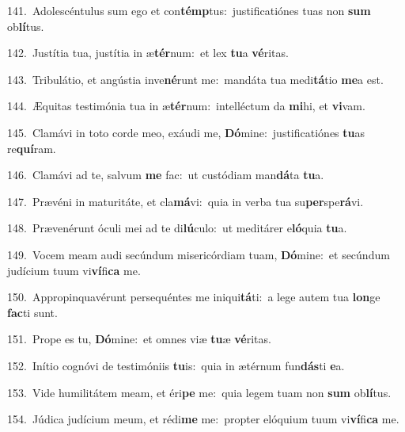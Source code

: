 {\numbfont\textcolor{\numbcolor}{141.}}~Adolescéntulus sum ego et con\-\textbf{témp}\-tus:~\star justificatiónes tuas non \textbf{sum} ob\-\textbf{lí}\-tus.\par
{\numbfont\textcolor{\numbcolor}{142.}}~Justítia tua, justítia in æ\-\textbf{tér}\-num:~\star et lex \textbf{tu}\-a \textbf{vé}\-ritas.\par
{\numbfont\textcolor{\numbcolor}{143.}}~Tribulátio, et angústia inve\-\textbf{né}\-runt me:~\star mandáta tua medi\-\textbf{tá}\-tio \textbf{me}\-a est.\par
{\numbfont\textcolor{\numbcolor}{144.}}~Æquitas testimónia tua in æ\-\textbf{tér}\-num:~\star intelléctum da \textbf{mi}\-hi, et \textbf{vi}\-vam.\par
{\numbfont\textcolor{\numbcolor}{145.}}~Clamávi in toto corde meo, exáudi me, \textbf{Dó}\-mine:~\star justificatiónes \textbf{tu}\-as re\-\textbf{quí}\-ram.\par
{\numbfont\textcolor{\numbcolor}{146.}}~Clamávi ad te, salvum \textbf{me} fac:~\star ut custódiam man\-\textbf{dá}\-ta \textbf{tu}\-a.\par
{\numbfont\textcolor{\numbcolor}{147.}}~Prævéni in maturitáte, et cla\-\textbf{má}\-vi:~\star quia in verba tua su\-\textbf{per}\-spe\-\textbf{rá}\-vi.\par
{\numbfont\textcolor{\numbcolor}{148.}}~Prævenérunt óculi mei ad te di\-\textbf{lú}\-culo:~\star ut meditárer e\-\textbf{ló}\-quia \textbf{tu}\-a.\par
{\numbfont\textcolor{\numbcolor}{149.}}~Vocem meam audi secúndum misericórdiam tuam, \textbf{Dó}\-mine:~\star et secúndum judícium tuum vi\-\textbf{ví}\-fi\textbf{ca} me.\par
{\numbfont\textcolor{\numbcolor}{150.}}~Appropinquavérunt persequéntes me iniqui\-\textbf{tá}\-ti:~\star a lege autem tua \textbf{lon}\-ge \textbf{fac}\-ti sunt.\par
{\numbfont\textcolor{\numbcolor}{151.}}~Prope es tu, \textbf{Dó}\-mine:~\star et omnes viæ \textbf{tu}\-æ \textbf{vé}\-ritas.\par
{\numbfont\textcolor{\numbcolor}{152.}}~Inítio cognóvi de testimóniis \textbf{tu}\-is:~\star quia in ætérnum fun\-\textbf{dás}\-ti \textbf{e}\-a.\par
{\numbfont\textcolor{\numbcolor}{153.}}~Vide humilitátem meam, et éri\textbf{pe} me:~\star quia legem tuam non \textbf{sum} ob\-\textbf{lí}\-tus.\par
{\numbfont\textcolor{\numbcolor}{154.}}~Júdica judícium meum, et rédi\textbf{me} me:~\star propter elóquium tuum vi\-\textbf{ví}\-fi\textbf{ca} me.\par
